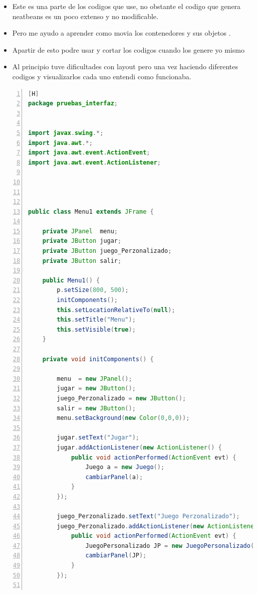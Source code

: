 \documentclass{article}
\begin{document}
	\clearpage
	

	
	
\begin{itemize}
		\item Este es una parte de los codigos que use, no obstante el codigo que genera neatbeans es un poco extenso y no modificable.
		\item Pero me ayudo a aprender como movia los contenedores y sus objetos .
		\item Apartir de esto podre usar y cortar los codigos cuando los genere yo mismo
		\item Al principio tuve dificultades con layout pero una vez haciendo diferentes codigos y visualizarlos cada uno entendi como funcionaba.
\end{itemize}
	\begin{lstlisting}[language=Java,caption={Analizando codigo generado por NeatBeans},numbers=left,][H]
package pruebas_interfaz;


import javax.swing.*;
import java.awt.*;
import java.awt.event.ActionEvent;
import java.awt.event.ActionListener;




public class Menu1 extends JFrame {

    private JPanel  menu;
    private JButton jugar;
    private JButton juego_Perzonalizado;
    private JButton salir;

    public Menu1() {
        p.setSize(800, 500);
        initComponents();
        this.setLocationRelativeTo(null);
        this.setTitle("Menu");
        this.setVisible(true);
    }

    private void initComponents() {

        menu  = new JPanel();
        jugar = new JButton();
        juego_Perzonalizado = new JButton();
        salir = new JButton();
        menu.setBackground(new Color(0,0,0));

        jugar.setText("Jugar");
        jugar.addActionListener(new ActionListener() {
            public void actionPerformed(ActionEvent evt) {
                Juego a = new Juego();
                cambiarPanel(a);
            }
        });

        juego_Perzonalizado.setText("Juego Perzonalizado");
        juego_Perzonalizado.addActionListener(new ActionListener() {
            public void actionPerformed(ActionEvent evt) {
                JuegoPersonalizado JP = new JuegoPersonalizado();
                cambiarPanel(JP);
            }
        });


\end{lstlisting}
\end{document}
